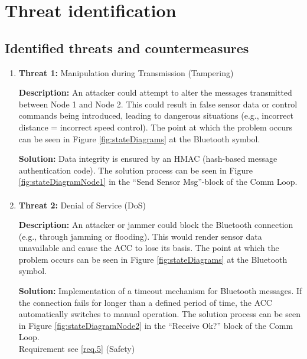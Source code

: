 \section{Threat identification}
\label{chapter5}

\subsection{Identified threats and countermeasures}


	\begin{enumerate}
		\item \textbf{Threat 1:} Manipulation during Transmission (Tampering)
            
            \textbf{Description:} An attacker could attempt to alter the messages transmitted between Node 1 and Node 2. This could result in false sensor data or control commands being introduced, leading to dangerous situations (e.g., incorrect distance = incorrect speed control). The point at which the problem occurs can be seen in Figure \ref{fig:stateDiagrams} at the Bluetooth symbol.
            
            \textbf{Solution:} Data integrity is ensured by an HMAC (hash-based message authentication code). The solution process can be seen in Figure \ref{fig:stateDiagramNode1} in the “Send Sensor Msg”-block of the Comm Loop.
        
        \paragraph{} 
		\item \textbf{Threat 2:} Denial of Service (DoS)
            
            \textbf{Description:} An attacker or jammer could block the Bluetooth connection (e.g., through jamming or flooding). This would render sensor data unavailable and cause the ACC to lose its basis. The point at which the problem occurs can be seen in Figure \ref{fig:stateDiagrams} at the Bluetooth symbol.
            
            \textbf{Solution:} Implementation of a timeout mechanism for Bluetooth messages. If the connection fails for longer than a defined period of time, the ACC automatically switches to manual operation. The solution process can be seen in Figure \ref{fig:stateDiagramNode2} in the “Receive Ok?” block of the Comm Loop. \\
			Requirement see \ref{req.5} (Safety)
        

\end{enumerate}
